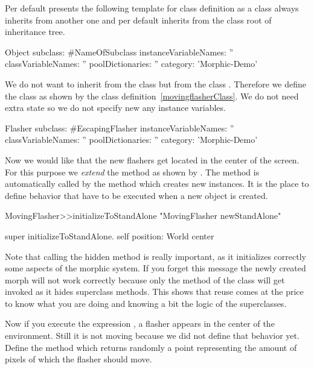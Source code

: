 Per default \sq presents the following template for class definition as a class always inherits from another one and per default inherits from the class  root of inheritance tree. 

\begin{classdef}\label{movingflasher}
Object subclass: #NameOfSubclass
   instanceVariableNames: ''
   classVariableNames: ''
   poolDictionaries: ''
   category: 'Morphic-Demo'
\end{classdef}

We do not want to inherit from the class  but from the class . Therefore we define the class  as shown by the class definition~\ref{movingflasherClass}. We do not need extra state so we do not specify new any instance variables. 

\begin{classdef}\label{movingflasherClass}
Flasher subclass: #EscapingFlasher
   instanceVariableNames: ''
   classVariableNames: ''
   poolDictionaries: ''
   category: 'Morphic-Demo'
\end{classdef}

Now we would like that the new flashers get located in the center of the screen. For this purpose we \emph{extend} the method  as shown by . The method  is automatically called by the method  which creates new instances. It is the place to define behavior that have to be executed when a new object is created.

\begin{method}\label{mth:MovingFlasherinitializeToStandAlone}
MovingFlasher>>initializeToStandAlone
   "MovingFlasher newStandAlone"

   super initializeToStandAlone.
   self position: World center
\end{method}

Note that calling the hidden method  is really important, as it initializes correctly some aspects of the morphic system. If you forget this message the newly created morph will not work correctly because only the method  of the class  will get invoked as it hides superclass methods. This shows that reuse comes at the price to know what you are doing and knowing a bit the logic of the superclasses.

Now if you execute the expression , a flasher appears in the center of the \sq environment. Still it is not moving because we did not define that behavior yet. 
Define the method  which returns randomly a point representing the amount of pixels of which the flasher should move. 

